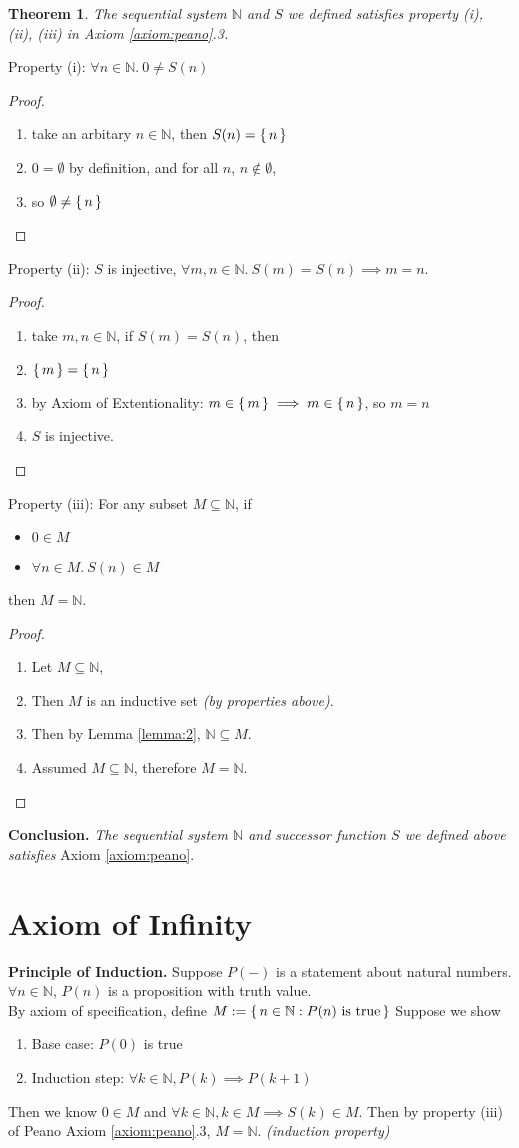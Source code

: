 \documentclass[12pt]{article}
\newenvironment{prf}
{
    \begin{proof}
        \hfill
        \begin{enumerate}[label*=\arabic*.]
                }
                {
                \hfill\qedsymbol
        \end{enumerate}
    \renewcommand{\qedsymbol}{}
    \end{proof}
}
\newcounter{dummy} \numberwithin{dummy}{section}
\newtheorem{theorem}[dummy]{Theorem}
\theoremstyle{definition}
\newcommand{\nat}{\mathbb{N}}
\begin{document}
\begin{theorem}
    The sequential system $\nat$ and $S$ we defined satisfies property (i), (ii), (iii) in \emph{Axiom \ref{axiom:peano}.3}.
\end{theorem}
Property (i): $\forall n \in \nat.~0 \neq S(n)$
\begin{prf}
\item take an arbitary $n \in \nat$, then $S(n) = \set{n}$
\item $0 = \emptyset$ by definition, and for all $n$, $n \not\in \emptyset$,
\item so $\emptyset \neq \set{n}$
\end{prf}
Property (ii): $S$ is injective, $\forall m,n \in \nat.~ S(m) = S(n) \implies m = n.$
\begin{prf}
\item take $m,n \in \nat$, if $S(m) = S(n)$, then
\item $\set{m} = \set{n}$
\item by Axiom of Extentionality: $m \in \set{m} \implies m \in \set{n}$, so $m=n$
\item $S$ is injective.
\end{prf}
Property (iii): For any subset $M \subseteq \nat$, if
\begin{itemize}
    \item $0 \in M$
    \item $\forall n \in M.~ S(n) \in M$
\end{itemize}
then $M = \nat$.
\begin{prf}
\item Let $M \subseteq \nat$,
\item Then $M$ is an inductive set \emph{(by properties above)}.
\item Then by Lemma \ref{lemma:2}, $\nat \subseteq M$.
\item Assumed $M \subseteq \nat$, therefore $M = \nat$.
\end{prf}
\textbf{Conclusion.} \emph{The sequential system $\nat$ and successor function $S$ we defined above satisfies }Axiom \ref{axiom:peano}.
\hfill\\
\section{Axiom of Infinity}
\textbf{Principle of Induction.} Suppose $P(-)$ is a statement about natural numbers. $\forall n \in \nat$, $P(n)$ is a proposition with truth value.\\
By axiom of specification, define $M:= \set{ n \in \nat : P(n)~\text{is true}}$
Suppose we show
\begin{enumerate}[label=(\arabic*)]
    \item Base case: $P(0)$ is true
    \item Induction step: $\forall k \in \nat, P(k) \implies P(k+1)$
\end{enumerate}
Then we know $0 \in M$ and $\forall k \in \nat, k \in M \implies S(k) \in M$.
Then by property (iii) of Peano Axiom \ref{axiom:peano}.3, $M = \nat$. \hfill\emph{(induction property)}
\hfil\\
\end{document}
